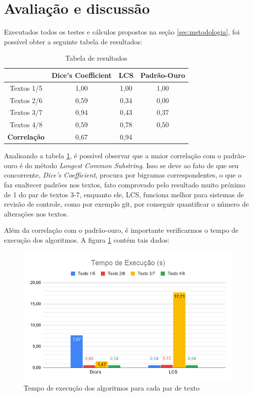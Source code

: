 \documentclass[12pt]{article}
\begin{document}
\section{Avaliação e discussão} \label{sec:avaliacao}

Executados todos os testes e cálculos propostos na seção \ref{sec:metodologia}, foi possível obter a seguinte tabela de resultados:

\begin{table}[H]
\centering
\begin{tabular}{|c|c|c|c}
\hline
 & Dice's Coefficient & LCS & \multicolumn{1}{c|}{Padrão-Ouro} \\ \hline
Textos 1/5 & 1,00 & 1,00 & \multicolumn{1}{c|}{1,00} \\ \hline
Textos 2/6 & 0,59 & 0,34 & \multicolumn{1}{c|}{0,00} \\ \hline
Textos 3/7 & 0,94 & 0,43 & \multicolumn{1}{c|}{0,37} \\ \hline
Textos 4/8 & 0,59 & 0,78 & \multicolumn{1}{c|}{0,50} \\ \hline
\multicolumn{1}{|l|}{\textbf{Correlação}} & 0,67 & 0,94 & \multicolumn{1}{l}{} \\ \cline{1-3}
\end{tabular}
\caption{Tabela de resultados}
\label{tab:resultados}
\end{table}

Analisando a tabela \ref{tab:resultados}, é possível observar que a maior correlação com o padrão-ouro é do método \textit{Longest Common Substring}. Isso se deve ao fato de que seu concorrente, \textit{Dice's Coefficient}, procura por bigramas correspondentes, o que o faz enaltecer padrões nos textos, fato comprovado pelo resultado muito próximo de 1 do par de textos 3-7, enquanto ele, LCS, funciona melhor para sistemas de revisão de controle, como por exemplo git, por conseguir quantificar o número de alterações nos textos.

Além da correlação com o padrão-ouro, é importante verificarmos o tempo de execução dos algoritmos. A figura \ref{fig:exec-time} contém tais dados:

\begin{figure}[H]
    \centering
    \includegraphics[scale=0.65]{exec-time.png}
    \caption{Tempo de execução dos algoritmos para cada par de texto}
    \label{fig:exec-time}
\end{figure}
\end{document}
